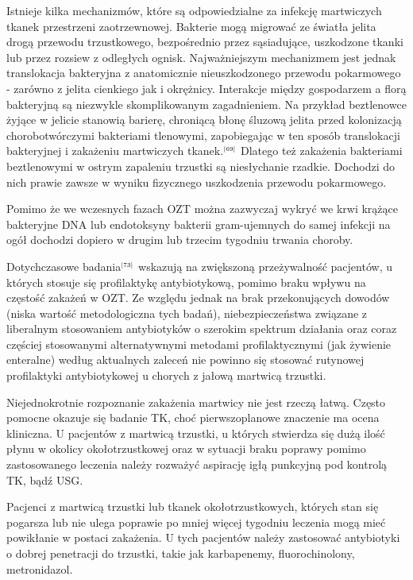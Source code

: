 \documentclass[a4paper, 12pt]{report}
\newcommand\cyt[1]{$^{\tiny{\cite{#1}}}$}
\begin{document}
Istnieje kilka mechanizmów, które są odpowiedzialne za infekcję
martwiczych tkanek przestrzeni zaotrzewnowej. Bakterie mogą migrować
ze światła jelita drogą przewodu trzustkowego, bezpośrednio przez
sąsiadujące, uszkodzone tkanki lub przez rozsiew z odległych
ognisk. Najważniejszym mechanizmem jest jednak translokacja bakteryjna
z anatomicznie nieuszkodzonego przewodu pokarmowego - zarówno z jelita
cienkiego jak i okrężnicy. Interakcje między gospodarzem a florą
bakteryjną są niezwykle skomplikowanym zagadnieniem. Na przykład
beztlenowce żyjące w jelicie stanowią barierę, chroniącą błonę śluzową
jelita przed kolonizacją chorobotwórczymi bakteriami
tlenowymi, zapobiegając w ten sposób translokacji bakteryjnej i
zakażeniu martwiczych tkanek.\cyt{69} Dlatego też zakażenia bakteriami
beztlenowymi w ostrym zapaleniu trzustki są niesłychanie
rzadkie. Dochodzi do nich prawie zawsze w wyniku fizycznego
uszkodzenia przewodu pokarmowego.

Pomimo że we wczesnych fazach OZT można zazwyczaj wykryć we krwi
krążące bakteryjne DNA lub endotoksyny bakterii gram-ujemnych do samej
infekcji na ogół dochodzi dopiero w drugim lub trzecim tygodniu
trwania choroby.

Dotychczasowe badania\cyt{73} wskazują na zwiększoną przeżywalność
pacjentów, u których stosuje się profilaktykę antybiotykową, pomimo
braku wpływu na częstość zakażeń w OZT. Ze względu jednak na brak
przekonujących dowodów (niska wartość metodologiczna tych badań),
niebezpieczeństwa związane z liberalnym stosowaniem antybiotyków o
szerokim spektrum działania oraz coraz częściej stosowanymi
alternatywnymi metodami profilaktycznymi (jak żywienie enteralne)
według aktualnych zaleceń nie powinno się stosować rutynowej
profilaktyki antybiotykowej u chorych z jałową martwicą trzustki.

Niejednokrotnie rozpoznanie zakażenia martwicy nie jest rzeczą
łatwą. Często pomocne okazuje się badanie TK, choć pierwszoplanowe
znaczenie ma ocena kliniczna. U pacjentów z martwicą trzustki, u
których stwierdza się dużą ilość płynu w okolicy okołotrzustkowej
oraz w sytuacji braku poprawy pomimo zastosowanego leczenia należy
rozważyć aspirację igłą punkcyjną pod kontrolą TK, bądź USG.

Pacjenci z martwicą trzustki lub tkanek okołotrzustkowych, których
stan się pogarsza lub nie ulega poprawie po mniej więcej tygodniu
leczenia mogą mieć powikłanie w postaci zakażenia. U tych pacjentów
należy zastosować antybiotyki o dobrej penetracji do trzustki,
takie jak karbapenemy, fluorochinolony, metronidazol.
\end{document}
